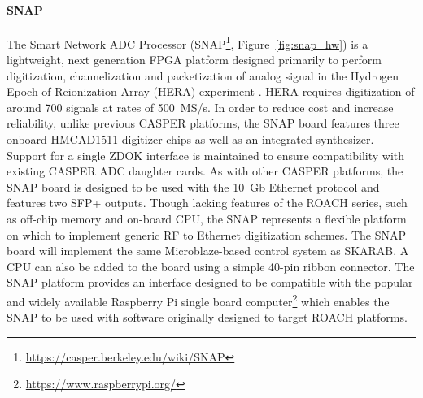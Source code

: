 \documentclass{ws-jai}
\begin{document}
\paragraph*{SNAP}
The Smart Network ADC Processor
(SNAP\footnote{\url{https://casper.berkeley.edu/wiki/SNAP}}, Figure~\ref{fig:snap_hw}) is a lightweight, next generation
FPGA platform designed primarily to perform digitization, channelization and packetization of analog signal in the Hydrogen Epoch of
Reionization Array (HERA) experiment \citep{2016arXiv160607473D}. HERA requires digitization of around 700 signals at rates of 500~MS/s. In order to reduce cost and increase reliability, unlike previous CASPER platforms, the SNAP board features three onboard HMCAD1511 digitizer chips as well as an integrated synthesizer. Support for a single ZDOK interface is maintained to ensure compatibility with existing CASPER ADC daughter cards.
As with other CASPER platforms, the SNAP board is designed to be used with the 10~Gb Ethernet protocol and features two SFP+ outputs. Though lacking features of the ROACH series, such as off-chip memory and on-board CPU, the SNAP represents a flexible platform on which to implement generic RF to Ethernet digitization schemes.
The SNAP board will implement the same Microblaze-based control system as SKARAB. A CPU can also be added to the board using a simple 40-pin ribbon connector. The SNAP platform provides an interface designed to be compatible with the popular and widely available Raspberry Pi single board computer\footnote{\url{https://www.raspberrypi.org/}} which enables the SNAP to be used with software originally designed to target ROACH platforms.
% 
\end{document}
